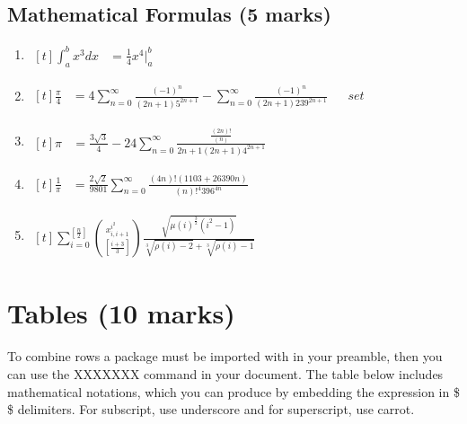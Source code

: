 \documentclass[11pt]{article}
\begin{document}
\subsection{Mathematical Formulas (5 marks)}
\renewcommand{\theenumi}{\arabic{enumi}}
\begin{enumerate}
	\item
	$
	\!
	\begin{aligned}[t]
 	\int_a^b x^3 dx
    	&= \frac{1}{4} x^4 \biggr|_a^b &&
	\end{aligned}
	$
	\item
	$
	\!
	\begin{aligned}[t]
 	\frac{\pi}{4}
    	&= 4 \sum_{n=0}^{\infty} \frac{(-1)^n}{(2n+1)5^{2n+1}} - \sum_{n=0}^{\infty} \frac{(-1)^n}{(2n+1)239^{2n+1}} &&set 
	\end{aligned}
	$
	\item
	$
	\!
	\begin{aligned}[t]
 	\pi
    	&= \frac{3\sqrt{3}}{4} - 24\sum_{n=0}^{\infty} \frac{\frac{(2n)!}{(n)}}{2n+1(2n+1)4^{2n+1}} &&
	\end{aligned}
	$
	\item
	$
	\!
	\begin{aligned}[t]
 	\frac{1}{\pi}
    	&= \frac{2\sqrt{2}}{9801} \sum_{n=0}^{\infty} \frac{(4n)!(1103+26390n)}{(n)!^4 396^{4n}} &&
	\end{aligned}
	$
	\item
	$
	\!
	\begin{aligned}[t]
 	\sum\nolimits_{i=0}^{[\frac{n}{2}]} {{x_{i,i+1}^{i^2}} \choose {[\frac{i+3}{3}]}} {\frac{\sqrt{{\mu (i)}^{\frac{3}{2}} (i^{2}-1)}}{\sqrt[3]{\rho (i)-2} + \sqrt[3]{\rho (i)-1}}}
	\end{aligned}
	$
\end{enumerate}

\newpage
\section{Tables (10 marks)}
\noindent
To combine rows a package must be imported with in your preamble, then you
can use the XXXXXXX command in your document. The table below includes
mathematical notations, which you can produce by embedding the expression
in \$ \$ delimiters. For subscript, use underscore and for superscript, use carrot.
\end{document}
